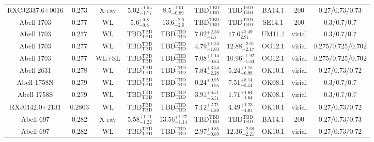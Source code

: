 \begin{table}
\begin{tabular}{cccccccccc}
RXCJ2337.6+0016 & 0.273 & X-ray & ${5.02}^{+1.55}_{-1.77}$ & ${8.5}^{+1.01}_{-0.89}$ & ${\mathrm{TBD}}^{\mathrm{TBD}}_{\mathrm{TBD}}$ & ${\mathrm{TBD}}^{\mathrm{TBD}}_{\mathrm{TBD}}$ & BA14.1 & 200 & 0.27/0.73/0.73 \\
Abell 1703 & 0.277 & WL & ${5.6}^{+0.8}_{-0.8}$ & ${13.6}^{+2.0}_{-2.0}$ & ${\mathrm{TBD}}^{\mathrm{TBD}}_{\mathrm{TBD}}$ & ${\mathrm{TBD}}^{\mathrm{TBD}}_{\mathrm{TBD}}$ & SE14.1 & 200 & 0.3/0.7/0.7 \\
Abell 1703 & 0.277 & WL & ${\mathrm{TBD}}^{\mathrm{TBD}}_{\mathrm{TBD}}$ & ${\mathrm{TBD}}^{\mathrm{TBD}}_{\mathrm{TBD}}$ & ${7.02}^{+2.36}_{-1.7}$ & ${17.6}^{+3.49}_{2.91}$ & UM11.1 & virial & 0.3/0.7/0.7 \\
Abell 1703 & 0.277 & WL & ${\mathrm{TBD}}^{\mathrm{TBD}}_{\mathrm{TBD}}$ & ${\mathrm{TBD}}^{\mathrm{TBD}}_{\mathrm{TBD}}$ & ${4.79}^{+1.24}_{-1.03}$ & ${12.88}^{+2.61}_{-2.17}$ & OG12.1 & virial & 0.275/0.725/0.702 \\
Abell 1703 & 0.277 & WL+SL & ${\mathrm{TBD}}^{\mathrm{TBD}}_{\mathrm{TBD}}$ & ${\mathrm{TBD}}^{\mathrm{TBD}}_{\mathrm{TBD}}$ & ${7.08}^{+1.14}_{-0.84}$ & ${10.96}^{+1.92}_{-1.63}$ & OG12.1 & virial & 0.275/0.725/0.702 \\
Abell 2631 & 0.278 & WL & ${\mathrm{TBD}}^{\mathrm{TBD}}_{\mathrm{TBD}}$ & ${\mathrm{TBD}}^{\mathrm{TBD}}_{\mathrm{TBD}}$ & ${7.84}^{+3.54}_{-2.28}$ & ${5.24}^{+1.15}_{-0.98}$ & OK10.1 & virial & 0.27/0.73/0.72 \\
Abell 1758N & 0.279 & WL & ${\mathrm{TBD}}^{\mathrm{TBD}}_{\mathrm{TBD}}$ & ${\mathrm{TBD}}^{\mathrm{TBD}}_{\mathrm{TBD}}$ & ${0.24}^{+0.95}_{-0.95}$ & ${7.51}^{+8.14}_{-8.14}$ & OK08.1 & virial & 0.3/0.7/0.7 \\
Abell 1758S & 0.279 & WL & ${\mathrm{TBD}}^{\mathrm{TBD}}_{\mathrm{TBD}}$ & ${\mathrm{TBD}}^{\mathrm{TBD}}_{\mathrm{TBD}}$ & ${3.91}^{+6.51}_{-6.51}$ & ${1.71}^{+1.64}_{-1.64}$ & OK08.1 & virial & 0.3/0.7/0.7 \\
RXJ0142.0+2131 & 0.2803 & WL & ${\mathrm{TBD}}^{\mathrm{TBD}}_{\mathrm{TBD}}$ & ${\mathrm{TBD}}^{\mathrm{TBD}}_{\mathrm{TBD}}$ & ${7.12}^{+2.71}_{-1.89}$ & ${4.49}^{+1.23}_{-1.01}$ & OK10.1 & virial & 0.27/0.73/0.72 \\
Abell 697 & 0.282 & X-ray & ${5.58}^{+1.11}_{-1.22}$ & ${13.56}^{+1.27}_{-1.14}$ & ${\mathrm{TBD}}^{\mathrm{TBD}}_{\mathrm{TBD}}$ & ${\mathrm{TBD}}^{\mathrm{TBD}}_{\mathrm{TBD}}$ & BA14.1 & 200 & 0.27/0.73/0.73 \\
Abell 697 & 0.282 & WL & ${\mathrm{TBD}}^{\mathrm{TBD}}_{\mathrm{TBD}}$ & ${\mathrm{TBD}}^{\mathrm{TBD}}_{\mathrm{TBD}}$ & ${2.97}^{+0.85}_{-0.69}$ & ${12.36}^{+2.68}_{-2.21}$ & OK10.1 & virial & 0.27/0.73/0.72 \\

\end{tabular}
\end{table}
